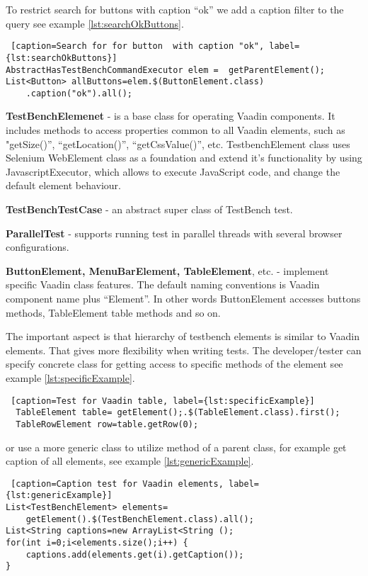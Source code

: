 To restrict search for buttons with caption ``ok'' we add a caption filter to
the query see example \ref{lst:searchOkButtons}.
  \lstset{style=a1listing}
  \begin{lstlisting} [caption=Search for for button  with caption "ok", label={lst:searchOkButtons}]
AbstractHasTestBenchCommandExecutor elem =  getParentElement();
List<Button> allButtons=elem.$(ButtonElement.class)
	.caption("ok").all();
  \end{lstlisting}
  
\textbf{TestBenchElemenet} - is a base class for operating Vaadin components. It
includes methods to access properties common to all Vaadin elements,
such as "getSize()'', ``getLocation()'', ``getCssValue()'', etc.
TestbenchElement class uses Selenium WebElement class as a foundation and extend
it's functionality by using JavascriptExecutor,
which allows to execute JavaScript code, and change the default element behaviour.

\textbf{TestBenchTestCase} - an abstract super class of TestBench test.

\textbf{ParallelTest} - supports running test in parallel threads with several
browser configurations.

\textbf{ButtonElement, MenuBarElement, TableElement}, etc. - implement specific
Vaadin class features. The default naming conventions is Vaadin component name
plus ``Element''. In other words ButtonElement accesses buttons methods,
TableElement table methods and so on.

The important aspect is that hierarchy of testbench elements is similar to Vaadin elements.
That gives more flexibility when writing tests. The  developer/tester can
specify concrete class for getting access to specific methods of the element see example \ref{lst:specificExample}.
 
\lstset{style=a1listing}
\begin{lstlisting} [caption=Test for Vaadin table, label={lst:specificExample}]
  TableElement table= getElement();.$(TableElement.class).first();
  TableRowElement row=table.getRow(0);
 \end{lstlisting}
 
or use a more generic class to utilize method of a parent class, for example get
caption of all elements, see example \ref{lst:genericExample}.

\lstset{style=a1listing}
\begin{lstlisting} [caption=Caption test for Vaadin elements, label={lst:genericExample}]
List<TestBenchElement> elements=
	getElement().$(TestBenchElement.class).all();
List<String captions=new ArrayList<String ();
for(int i=0;i<elements.size();i++) {
	captions.add(elements.get(i).getCaption());
}
\end{lstlisting}

